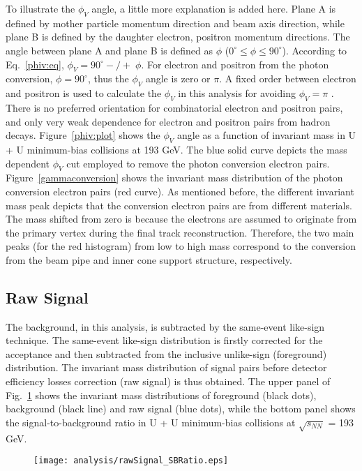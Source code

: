 To illustrate the $\phi_{V}$ angle, a little more explanation is added here. Plane A is defined by mother particle momentum direction and beam axis direction, while plane B is defined by the daughter electron, positron momentum directions. The angle between plane A and plane B is defined as $\phi$ ($0^{\circ} \le \phi \le 90^{\circ}$). According to Eq.~\ref{phiv:eq}, $\phi_{V} = 90^{\circ} -/+\;\phi$. For electron and positron from the photon conversion, $\phi = 90^{\circ}$, thus the $\phi_{V}$ angle is zero or $\pi$. A fixed order between electron and positron is used to calculate the $\phi_{V}$ in this analysis for avoiding $\phi_{V} = \pi$ . There is no preferred orientation for combinatorial electron and positron pairs, and only very weak dependence for electron and positron pairs from hadron decays. Figure~\ref{phiv:plot} shows the $\phi_{V}$ angle as a function of invariant mass in U + U minimum-bias collisions at 193 GeV. The blue solid curve depicts the mass dependent $\phi_{V}$ cut employed to remove the photon conversion electron pairs. Figure~\ref{gammaconversion} shows the invariant mass distribution of the photon conversion electron pairs (red curve). As mentioned before, the different invariant mass peak depicts that the conversion electron pairs are from different materials. The mass shifted from zero is because the electrons are assumed to originate from the primary vertex during the final track reconstruction. Therefore, the two main peaks (for the red histogram) from low to high mass correspond to the conversion from the beam pipe and inner cone support structure, respectively.

\subsection{Raw Signal}
The background, in this analysis, is subtracted by the same-event like-sign technique. The same-event like-sign distribution is firstly corrected for the acceptance and then subtracted from the inclusive unlike-sign (foreground) distribution. The invariant mass distribution of signal pairs before detector efficiency losses correction (raw signal) is thus obtained. The upper panel of Fig.~\ref{rawsignal} shows the invariant mass distributions of foreground (black dots), background (black line) and raw signal (blue dots), while the bottom panel shows the signal-to-background ratio in U + U  minimum-bias collisions at $\sqrt{s_{NN}}$ = 193 GeV.

\begin{figure}[htbp]
\centering
\texttt{[image: analysis/rawSignal\_SBRatio.eps]}
 \label{rawsignal}
\end{figure}

